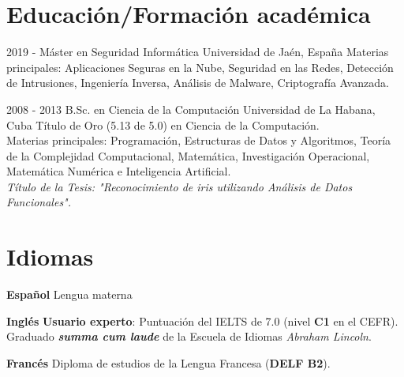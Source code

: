 \documentclass[]{friggeri-cv}
\begin{document}
\section{Educación/Formación académica}
\begin{entrylist}
  \entry
    {2019 - }
    {Máster en Seguridad Informática}
    {Universidad de Jaén, España}
    {
    	Materias principales: Aplicaciones Seguras en la Nube, Seguridad en las Redes, Detección de Intrusiones, Ingeniería Inversa, Análisis de Malware, Criptografía Avanzada.\\
    }

  \entry
    {2008 - 2013}
    {B.Sc. en Ciencia de la Computación}
    {Universidad de La Habana, Cuba}
    {Título de Oro (5.13 de 5.0) en Ciencia de la Computación.\\ Materias principales: Programación, Estructuras de Datos y Algoritmos, Teoría de la Complejidad Computacional, Matemática, Investigación Operacional, Matemática Numérica e Inteligencia Artificial.\\
    \emph{Título de la Tesis: "Reconocimiento de iris utilizando Análisis de Datos Funcionales".}}

\end{entrylist}

\section{Idiomas}
\begin{entrylist}
  \entry
    {\textbf{Español}}
    {}
    {}
    {Lengua materna}      

  \entry
    {\textbf{Inglés}}
    {}
    {}
    {
		\textbf{Usuario experto}: Puntuación del IELTS de 7.0 (nivel \textbf{C1} en el CEFR).\\    
    	Graduado \textbf{\emph{summa cum laude}} de la Escuela de Idiomas \emph{Abraham Lincoln}.
    }

  \entry
    {\textbf{Francés}}
    {}
    {}
    {Diploma de estudios de la Lengua Francesa (\textbf{DELF B2}).}
\end{entrylist}
\end{document}

